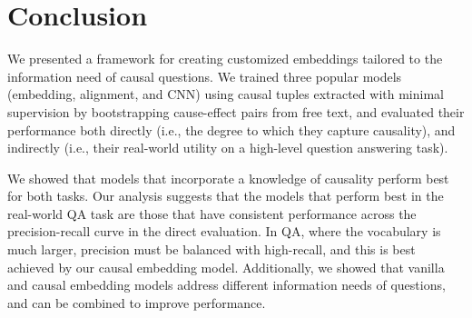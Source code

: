 \documentclass[11pt,letterpaper]{article}
\begin{document}
\begin{abstract}
%
\end{abstract}











\vspace{-1mm}
\section{Conclusion}
\vspace{-1mm}
We presented a framework for creating customized embeddings tailored to the information need of causal questions.  We trained three popular models (embedding, alignment, and CNN) using causal tuples extracted with minimal supervision by bootstrapping cause-effect pairs from free text, and evaluated their performance both directly (i.e., the degree to which they capture causality), and indirectly (i.e., their real-world utility on a high-level question answering task). 


We showed that models that incorporate a knowledge of causality perform best for both tasks. 
Our analysis suggests that the models that perform best in the real-world QA task are those that have consistent performance across the precision-recall curve in the direct evaluation.
In QA, where the vocabulary is much larger, precision must be balanced with high-recall, and this is best achieved by our causal embedding model.  Additionally, we showed that vanilla and causal embedding models address different information needs of questions, and can be combined to improve performance. 
\end{document}
